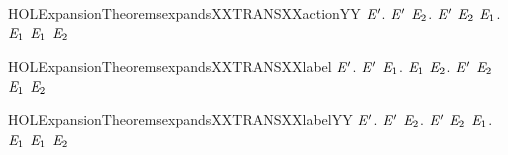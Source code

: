 \begin{SaveVerbatim}{HOLExpansionTheoremsexpandsXXTRANSXXactionYY}
\HOLTokenTurnstile{} \HOLSymConst{\HOLTokenForall{}} \ensuremath{\HOLBoundVar{E}\sp{\prime}}.
         \ensuremath{\HOLBoundVar{E}\sp{\prime}} \HOLSymConst{\HOLTokenImp{}}
       \HOLSymConst{\HOLTokenForall{}} \ensuremath{\HOLBoundVar{E}\sb{\mathrm{2}}}. \ensuremath{\HOLBoundVar{E}\sp{\prime}} \HOLTokenTransBegin{}\HOLTokenTransEnd \ensuremath{\HOLBoundVar{E}\sb{\mathrm{2}}} \HOLSymConst{\HOLTokenImp{}} \HOLSymConst{\HOLTokenExists{}}\ensuremath{\HOLBoundVar{E}\sb{\mathrm{1}}}.  \HOLTokenWeakTransBegin{}\HOLTokenWeakTransEnd \ensuremath{\HOLBoundVar{E}\sb{\mathrm{1}}} \HOLSymConst{\HOLTokenConj{}} \ensuremath{\HOLBoundVar{E}\sb{\mathrm{1}}}  \ensuremath{\HOLBoundVar{E}\sb{\mathrm{2}}}
\end{SaveVerbatim}
\newcommand{\HOLExpansionTheoremsexpandsXXTRANSXXactionYY}{\UseVerbatim{HOLExpansionTheoremsexpandsXXTRANSXXactionYY}}
\begin{SaveVerbatim}{HOLExpansionTheoremsexpandsXXTRANSXXlabel}
\HOLTokenTurnstile{} \HOLSymConst{\HOLTokenForall{}} \ensuremath{\HOLBoundVar{E}\sp{\prime}}.
         \ensuremath{\HOLBoundVar{E}\sp{\prime}} \HOLSymConst{\HOLTokenImp{}}
       \HOLSymConst{\HOLTokenForall{}} \ensuremath{\HOLBoundVar{E}\sb{\mathrm{1}}}.
            \HOLTokenTransBegin{} \HOLTokenTransEnd \ensuremath{\HOLBoundVar{E}\sb{\mathrm{1}}} \HOLSymConst{\HOLTokenImp{}} \HOLSymConst{\HOLTokenExists{}}\ensuremath{\HOLBoundVar{E}\sb{\mathrm{2}}}. \ensuremath{\HOLBoundVar{E}\sp{\prime}} \HOLTokenTransBegin{} \HOLTokenTransEnd \ensuremath{\HOLBoundVar{E}\sb{\mathrm{2}}} \HOLSymConst{\HOLTokenConj{}} \ensuremath{\HOLBoundVar{E}\sb{\mathrm{1}}}  \ensuremath{\HOLBoundVar{E}\sb{\mathrm{2}}}
\end{SaveVerbatim}
\newcommand{\HOLExpansionTheoremsexpandsXXTRANSXXlabel}{\UseVerbatim{HOLExpansionTheoremsexpandsXXTRANSXXlabel}}
\begin{SaveVerbatim}{HOLExpansionTheoremsexpandsXXTRANSXXlabelYY}
\HOLTokenTurnstile{} \HOLSymConst{\HOLTokenForall{}} \ensuremath{\HOLBoundVar{E}\sp{\prime}}.
         \ensuremath{\HOLBoundVar{E}\sp{\prime}} \HOLSymConst{\HOLTokenImp{}}
       \HOLSymConst{\HOLTokenForall{}} \ensuremath{\HOLBoundVar{E}\sb{\mathrm{2}}}.
           \ensuremath{\HOLBoundVar{E}\sp{\prime}} \HOLTokenTransBegin{} \HOLTokenTransEnd \ensuremath{\HOLBoundVar{E}\sb{\mathrm{2}}} \HOLSymConst{\HOLTokenImp{}} \HOLSymConst{\HOLTokenExists{}}\ensuremath{\HOLBoundVar{E}\sb{\mathrm{1}}}.  \HOLTokenWeakTransBegin{} \HOLTokenWeakTransEnd \ensuremath{\HOLBoundVar{E}\sb{\mathrm{1}}} \HOLSymConst{\HOLTokenConj{}} \ensuremath{\HOLBoundVar{E}\sb{\mathrm{1}}}  \ensuremath{\HOLBoundVar{E}\sb{\mathrm{2}}}
\end{SaveVerbatim}
